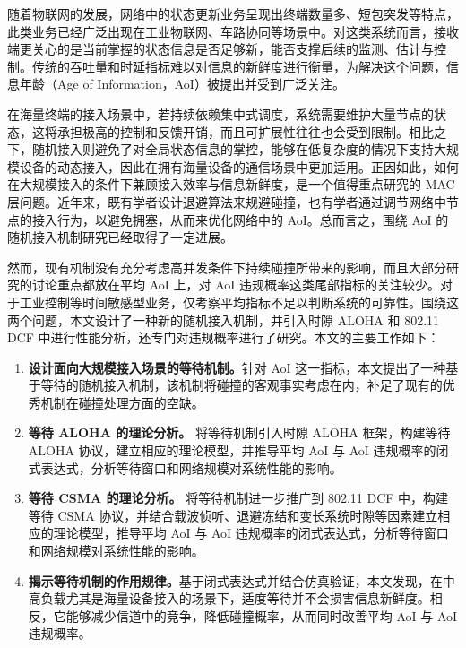 \begin{abstractCN}
\setlength{\baselineskip}{23pt} %

随着物联网的发展，网络中的状态更新业务呈现出终端数量多、短包突发等特点，此类业务已经广泛出现在工业物联网、车路协同等场景中。对这类系统而言，接收端更关心的是当前掌握的状态信息是否足够新，能否支撑后续的监测、估计与控制。传统的吞吐量和时延指标难以对信息的新鲜度进行衡量，为解决这个问题，信息年龄（Age of Information，AoI）被提出并受到广泛关注。

在海量终端的接入场景中，若持续依赖集中式调度，系统需要维护大量节点的状态，这将承担极高的控制和反馈开销，而且可扩展性往往也会受到限制。相比之下，随机接入则避免了对全局状态信息的掌控，能够在低复杂度的情况下支持大规模设备的动态接入，因此在拥有海量设备的通信场景中更加适用。正因如此，如何在大规模接入的条件下兼顾接入效率与信息新鲜度，是一个值得重点研究的 MAC 层问题。近年来，既有学者设计退避算法来规避碰撞，也有学者通过调节网络中节点的接入行为，以避免拥塞，从而来优化网络中的 AoI。总而言之，围绕 AoI 的随机接入机制研究已经取得了一定进展。

然而，现有机制没有充分考虑高并发条件下持续碰撞所带来的影响，而且大部分研究的讨论重点都放在平均 AoI 上，对 AoI 违规概率这类尾部指标的关注较少。对于工业控制等时间敏感型业务，仅考察平均指标不足以判断系统的可靠性。围绕这两个问题，本文设计了一种新的随机接入机制，并引入时隙 ALOHA 和 802.11 DCF 中进行性能分析，还专门对违规概率进行了研究。本文的主要工作如下：

\begin{enumerate} [wide]
    \item \textbf{设计面向大规模接入场景的等待机制。}针对 AoI 这一指标，本文提出了一种基于等待的随机接入机制，该机制将碰撞的客观事实考虑在内，补足了现有的优秀机制在碰撞处理方面的空缺。
    \item \textbf{等待 ALOHA 的理论分析。} 将等待机制引入时隙 ALOHA 框架，构建等待 ALOHA 协议，建立相应的理论模型，并推导平均 AoI 与 AoI 违规概率的闭式表达式，分析等待窗口和网络规模对系统性能的影响。
    \item \textbf{等待 CSMA 的理论分析。} 将等待机制进一步推广到 802.11 DCF 中，构建等待 CSMA 协议，并结合载波侦听、退避冻结和变长系统时隙等因素建立相应的理论模型，推导平均 AoI 与 AoI 违规概率的闭式表达式，分析等待窗口和网络规模对系统性能的影响。
    \item \textbf{揭示等待机制的作用规律。}基于闭式表达式并结合仿真验证，本文发现，在中高负载尤其是海量设备接入的场景下，适度等待并不会损害信息新鲜度。相反，它能够减少信道中的竞争，降低碰撞概率，从而同时改善平均 AoI 与 AoI 违规概率。
\end{enumerate}


\end{abstractCN}


